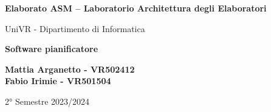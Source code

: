 \begin{titlepage}
	\begin{center}
		\vspace*{1cm}

		\Huge
		\textbf{Elaborato ASM – Laboratorio
			Architettura degli
			Elaboratori}

		\vspace{0.5cm}
		\LARGE
		UniVR - Dipartimento di Informatica

		\vspace{1cm}
		\huge
		\textbf{Software pianificatore}
		\vspace{1.5cm}


		\vfill


		\vspace{0.8cm}

		\Large
		\textbf{Mattia Arganetto - VR502412}\\
		\textbf{Fabio Irimie - VR501504}

		\vspace{0.5cm}

		2° Semestre 2023/2024

	\end{center}
\end{titlepage}
